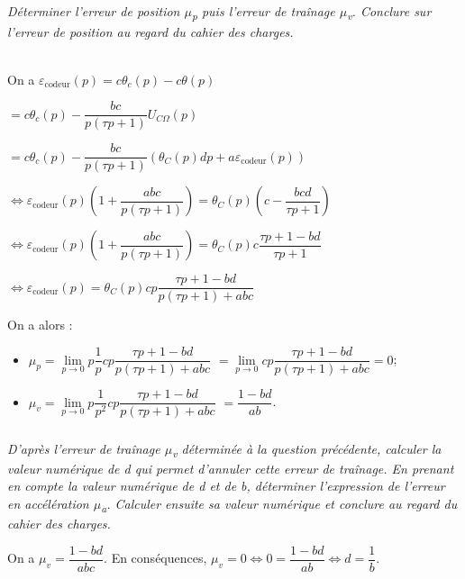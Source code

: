 \documentclass[10pt,fleqn]{article} %
\begin{document}
\begin{multicols}{2}
\subparagraph{\label{q13}}\textit{Déterminer l'erreur de position $\mu$\emph{\textsubscript{p}} puis
  l'erreur de traînage $\mu$\emph{\textsubscript{v}}. Conclure sur l'erreur
  de position au regard du cahier des charges.}
\ifprof
\begin{corrige} ~\\

On a 
$\varepsilon_{\text{codeur}}(p)=c\theta_c(p)-c\theta(p)$ 

$=c\theta_c(p)-\dfrac{bc}{p\left(\tau p + 1 \right)}U_{C \Omega }(p)$

 $=c\theta_c(p)-\dfrac{bc}{p\left(\tau p + 1 \right)}\left( \theta_C(p) dp + a \varepsilon_{\text{codeur}}(p) \right)$

$\Leftrightarrow \varepsilon_{\text{codeur}}(p)\left(1+\dfrac{abc}{p\left(\tau p + 1 \right)}\right) = \theta_C(p)  \left(c-\dfrac{bcd}{\tau p + 1 } \right)$

$\Leftrightarrow \varepsilon_{\text{codeur}}(p)\left(1+\dfrac{abc}{p\left(\tau p + 1 \right)}\right) = \theta_C(p)  c \dfrac{\tau p + 1 -bd}{\tau p + 1 } $

$\Leftrightarrow \varepsilon_{\text{codeur}}(p) = \theta_C(p)  cp \dfrac{\tau p + 1 -bd}{p\left(\tau p + 1 \right)+abc} $

On a alors : 
\begin{itemize}
\item $\mu_p=\lim\limits_{p\to0}  p\dfrac{1}{p}  cp \dfrac{\tau p + 1 -bd}{p\left(\tau p + 1 \right)+abc}$ $=\lim\limits_{p\to0}  cp \dfrac{\tau p + 1 -bd}{p\left(\tau p + 1 \right)+abc}=0$;
\item $\mu_v=\lim\limits_{p\to0}  p\dfrac{1}{p^2}  cp \dfrac{\tau p + 1 -bd}{p\left(\tau p + 1 \right)+abc}$ 
$= \dfrac{1 -bd}{ab}$.
\end{itemize}

\end{corrige}
\else
\fi
  
\subparagraph{\label{q14}}\textit{D'après l'erreur de traînage $\mu$\emph{\textsubscript{v}} déterminée à
  la question précédente, calculer la valeur numérique de d qui permet
  d'annuler cette erreur de traînage. En prenant en compte la valeur
  numérique de d et de b, déterminer l'expression de l'erreur en
  accélération $\mu$\emph{\textsubscript{a}}. Calculer ensuite sa valeur
  numérique et conclure au regard du cahier des charges.}
\ifprof
\begin{corrige}
On a $\mu_v= \dfrac{1 -bd}{abc}$. En conséquences, $\mu_v=0 \Leftrightarrow  0=\dfrac{1 -bd}{ab} \Leftrightarrow d=\dfrac{1}{b}$.


\end{corrige}
\end{multicols}
\end{document}
